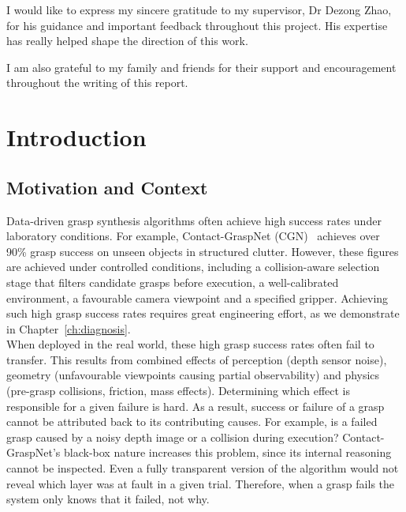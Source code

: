 \documentclass[11pt,a4paper]{report}
\begin{document}
I would like to express my sincere gratitude to my supervisor, Dr Dezong Zhao, for his guidance and important feedback throughout this project. His expertise has really helped shape the direction of this work.

\noindent I am also grateful to my family and friends for their support and encouragement throughout the writing of this report.

\tableofcontents
\listoffigures
\listoftables


\chapter{Introduction}
\label{ch:intro}

\section{Motivation and Context}
\label{sec:motivation}

Data-driven grasp synthesis algorithms often achieve high success rates under laboratory conditions. For example, Contact-GraspNet (CGN)~\cite{sundermeyer2021contactgraspnet} achieves over 90\% grasp success on unseen objects in structured clutter. However, these figures are achieved under controlled conditions, including a collision-aware selection stage that filters candidate grasps before execution, a well-calibrated environment, a favourable camera viewpoint and a specified gripper. Achieving such high grasp success rates requires great engineering effort, as we demonstrate in Chapter~\ref{ch:diagnosis}.\\

\noindent When deployed in the real world, these high grasp success rates often fail to transfer. This results from combined effects of perception (depth sensor noise), geometry (unfavourable viewpoints causing partial observability) and physics (pre-grasp collisions, friction, mass effects). Determining which effect is responsible for a given failure is hard. As a result, success or failure of a grasp cannot be attributed back to its contributing causes. For example, is a failed grasp caused by a noisy depth image or a collision during execution? Contact-GraspNet's black-box nature increases this problem, since its internal reasoning cannot be inspected. Even a fully transparent version of the algorithm would not reveal which layer was at fault in a given trial. Therefore, when a grasp fails the system only knows that it failed, not why.
\end{document}
